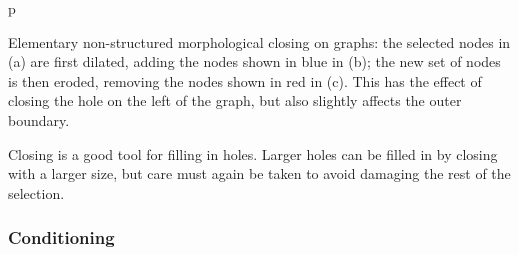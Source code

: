 \begin{stusubfig}{p}
	\hspace{4mm}%
	\hspace{4mm}%
\caption{Elementary non-structured morphological closing on graphs: the selected nodes in (a) are first dilated, adding the nodes shown in blue in (b); the new set of nodes is then eroded, removing the nodes shown in red in (c). This has the effect of closing the hole on the left of the graph, but also slightly affects the outer boundary.}
\label{fig:featureid-techniques-closing}
\end{stusubfig}

Closing is a good tool for filling in holes. Larger holes can be filled in by closing with a larger size, but care must again be taken to avoid damaging the rest of the selection.

\subsubsection{Conditioning}

